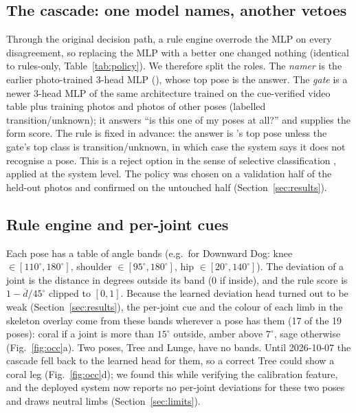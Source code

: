 \subsection{The cascade: one model names, another vetoes}\label{sec:cascade}
Through the original decision path, a rule engine overrode the MLP on every disagreement, so replacing the MLP with a better one changed nothing (identical to rules-only, Table~\ref{tab:policy}). We therefore split the roles. The \emph{namer} is the earlier photo-trained 3-head MLP (\vfour{}), whose top pose is the answer. The \emph{gate} is a newer 3-head MLP of the same architecture trained on the cue-verified video table plus training photos and photos of other poses (labelled transition/unknown); it answers ``is this one of my poses at all?'' and supplies the form score. The rule is fixed in advance: the answer is \vfour{}'s top pose unless the gate's top class is transition/unknown, in which case the system says it does not recognise a pose. This is a reject option in the sense of selective classification \cite{geifman2017selective}, applied at the system level. The policy was chosen on a validation half of the held-out photos and confirmed on the untouched half (Section~\ref{sec:results}).

\subsection{Rule engine and per-joint cues}
Each pose has a table of angle bands (e.g.\ for Downward Dog: knee $\in[110^\circ,180^\circ]$, shoulder $\in[95^\circ,180^\circ]$, hip $\in[20^\circ,140^\circ]$). The deviation of a joint is the distance in degrees outside its band (0 if inside), and the rule score is $1-\overline{d}/45^\circ$ clipped to $[0,1]$. Because the learned deviation head turned out to be weak (Section~\ref{sec:results}), the per-joint cue and the colour of each limb in the skeleton overlay come from these bands wherever a pose has them (17 of the 19 poses): coral if a joint is more than $15^\circ$ outside, amber above $7^\circ$, sage otherwise (Fig.~\ref{fig:occ}a). Two poses, Tree and Lunge, have no bands. Until 2026-10-07 the cascade fell back to the learned head for them, so a correct Tree could show a coral leg (Fig.~\ref{fig:occ}d); we found this while verifying the calibration feature, and the deployed system now reports no per-joint deviations for these two poses and draws neutral limbs (Section~\ref{sec:limits}).

